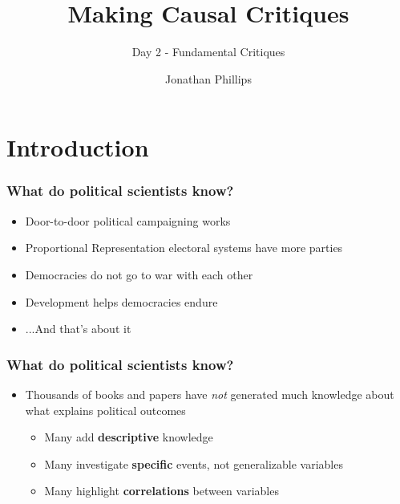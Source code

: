 \documentclass[xcolor=x11names,compress]{beamer}\usepackage[]{graphicx}\usepackage[]{color}
\title{Making Causal Critiques}
\subtitle{Day 2 - Fundamental Critiques}
\author{Jonathan Phillips}
\renewcommand{\(}{\begin{columns}}
\renewcommand{\)}{\end{columns}}
\newcommand{\<}[1]{\begin{column}{#1}}
\renewcommand{\>}{\end{column}}
\begin{document}
\frame{\titlepage}

\section{Introduction}

\begin{frame}
\frametitle{What do political scientists \textbf{know}?}
\begin{itemize}
\item Door-to-door political campaigning works
\pause
\item Proportional Representation electoral systems have more parties
\pause
\item Democracies do not go to war with each other
\pause
\item Development helps democracies endure
\pause
\item ...And that's about it
\end{itemize}
\end{frame}

\begin{frame}
\frametitle{What do political scientists \textbf{know}?}
\begin{itemize}
\item Thousands of books and papers have \textit{not} generated much knowledge about what explains political outcomes
\pause
\begin{itemize}
\item Many add \textbf{descriptive} knowledge
\pause
\item Many investigate \textbf{specific} events, not generalizable variables
\pause
\item Many highlight \textbf{correlations} between variables
\end{itemize}
\end{itemize}
\end{frame}
\end{document}

